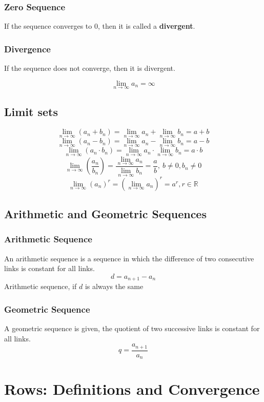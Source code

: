 \documentclass{book}
\begin{document}
\subsubsection{Zero Sequence}
If the sequence converges to $0$, then it is called a \textbf{divergent}.

\subsubsection{Divergence}
If the sequence does not converge, then it is divergent.

\[
\lim\limits_{n\to \infty} a_{n} = \infty
\]

\subsection{Limit sets}
\[
\lim\limits_{n\to \infty} (a_{n} + b_{n}) = \lim\limits_{n\to \infty} a_{n} + \lim\limits_{n\to \infty} b_{n} = a + b
\]
\[
\lim\limits_{n\to \infty} (a_{n} - b_{n}) = \lim\limits_{n\to \infty} a_{n} - \lim\limits_{n\to \infty} b_{n} = a - b
\]
\[
\lim\limits_{n\to \infty} (a_{n} \cdot b_{n}) = \lim\limits_{n\to \infty} a_{n} \cdot \lim\limits_{n\to \infty} b_{n} = a \cdot b
\]
\[
\lim\limits_{n\to \infty}(\frac{a_{n}}{b_{n}}) = \frac{\lim\limits_{n\to \infty} a_{n}}{\lim\limits_{n\to \infty} b_{n}} = \frac{a}{b}, \: b \ne 0, b_{n} \ne 0
\]
\[
\lim\limits_{n\to\infty} (a_{n})^{r} = \left(\lim\limits_{n\to\infty}a_{n}\right)^{r} = a^{r}, r \in \mathbb{R}
\]

\subsection{Arithmetic and Geometric Sequences}
\subsubsection{Arithmetic Sequence}
An arithmetic sequence is a sequence in which the difference of two consecutive links is constant for all links.
\[
  d = a_{n+1} - a_{n}
\]
Arithmetic sequence, if $d$ is always the same

\subsubsection{Geometric Sequence}
A geometric sequence is given, the quotient of two successive links is constant for all links.
\[
  q = \frac{a_{n+1}}{a_{n}}
\]


\section{Rows: Definitions and Convergence}
\end{document}
